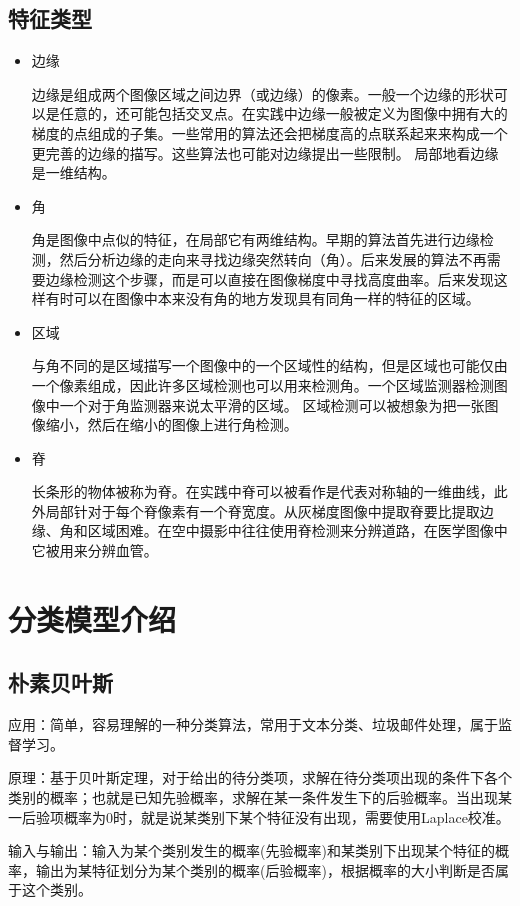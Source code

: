 \documentclass{HEBUTMaster}   %
\begin{document}
\section{特征类型}
\begin{itemize}
  \item 边缘

边缘是组成两个图像区域之间边界（或边缘）的像素。一般一个边缘的形状可以是任意的，还可能包括交叉点。在实践中边缘一般被定义为图像中拥有大的梯度的点组成的子集。一些常用的算法还会把梯度高的点联系起来来构成一个更完善的边缘的描写。这些算法也可能对边缘提出一些限制。
局部地看边缘是一维结构。
  \item 角

角是图像中点似的特征，在局部它有两维结构。早期的算法首先进行边缘检测，然后分析边缘的走向来寻找边缘突然转向（角）。后来发展的算法不再需要边缘检测这个步骤，而是可以直接在图像梯度中寻找高度曲率。后来发现这样有时可以在图像中本来没有角的地方发现具有同角一样的特征的区域。
\item 区域

与角不同的是区域描写一个图像中的一个区域性的结构，但是区域也可能仅由一个像素组成，因此许多区域检测也可以用来检测角。一个区域监测器检测图像中一个对于角监测器来说太平滑的区域。
区域检测可以被想象为把一张图像缩小，然后在缩小的图像上进行角检测。
  \item 脊

长条形的物体被称为脊。在实践中脊可以被看作是代表对称轴的一维曲线，此外局部针对于每个脊像素有一个脊宽度。从灰梯度图像中提取脊要比提取边缘、角和区域困难。在空中摄影中往往使用脊检测来分辨道路，在医学图像中它被用来分辨血管。
\end{itemize}
\chapter{分类模型介绍}
\section{朴素贝叶斯}
应用：简单，容易理解的一种分类算法，常用于文本分类、垃圾邮件处理，属于监督学习。

原理：基于贝叶斯定理，对于给出的待分类项，求解在待分类项出现的条件下各个类别的概率；也就是已知先验概率，求解在某一条件发生下的后验概率。当出现某一后验项概率为0时，就是说某类别下某个特征没有出现，需要使用Laplace校准。

输入与输出：输入为某个类别发生的概率(先验概率)和某类别下出现某个特征的概率，输出为某特征划分为某个类别的概率(后验概率)，根据概率的大小判断是否属于这个类别。
\end{document}
